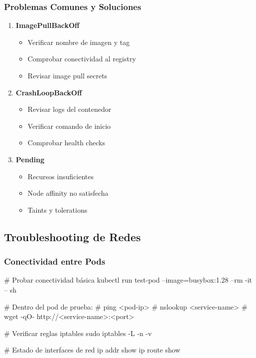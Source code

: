 \documentclass[11pt,a4paper]{article}
\begin{document}
\subsubsection{Problemas Comunes y Soluciones}

\begin{enumerate}
    \item \textbf{\textcolor{k8serror}{ImagePullBackOff}}
    \begin{itemize}
        \item Verificar nombre de imagen y tag
        \item Comprobar conectividad al registry
        \item Revisar image pull secrets
    \end{itemize}
    
    \item \textbf{\textcolor{k8serror}{CrashLoopBackOff}}
    \begin{itemize}
        \item Revisar logs del contenedor
        \item Verificar comando de inicio
        \item Comprobar health checks
    \end{itemize}
    
    \item \textbf{\textcolor{k8serror}{Pending}}
    \begin{itemize}
        \item Recursos insuficientes
        \item Node affinity no satisfecha
        \item Taints y tolerations
    \end{itemize}
\end{enumerate}

\subsection{Troubleshooting de Redes}

\subsubsection{Conectividad entre Pods}

\begin{commandbox}
\# Probar conectividad básica
kubectl run test-pod --image=busybox:1.28 --rm -it -- sh

\# Dentro del pod de prueba:
\# ping <pod-ip>
\# nslookup <service-name>
\# wget -qO- http://<service-name>:<port>

\# Verificar reglas iptables
sudo iptables -L -n -v

\# Estado de interfaces de red
ip addr show
ip route show
\end{commandbox}
\end{document}
